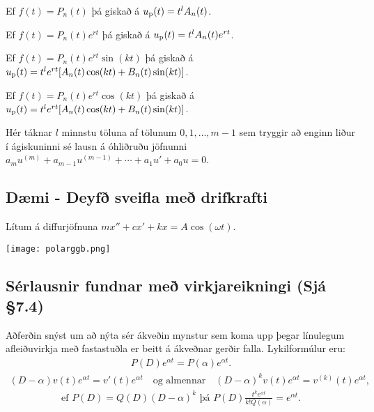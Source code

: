 \documentclass[a4paper,10pt,icelandic]{sphinxmanual}
\begin{document}
Ef \(f(t)=P_n(t)\) þá giskað á \(u_{\rm p}(t)=t^lA_n(t)\).

Ef \(f(t)=P_n(t)e^{rt}\) þá giskað á \(u_{\rm p}(t)=t^lA_n(t)e^{rt}\).

Ef \(f(t)=P_n(t)e^{rt}\sin(kt)\) þá giskað á \(u_{\rm p}(t)=t^le^{rt}[A_n(t)\cos(kt)+B_n(t)\sin(kt)]\).

Ef \(f(t)=P_n(t)e^{rt}\cos(kt)\) þá giskað á \(u_{\rm p}(t)=t^le^{rt}[A_n(t)\cos(kt)+B_n(t)\sin(kt)]\).

Hér táknar \(l\) minnstu töluna af tölunum \(0, 1, \ldots, m-1\) sem tryggir að enginn liður í ágiskuninni sé lausn á óhliðruðu jöfnunni \(a_mu^{(m)}+a_{m-1}u^{(m-1)}+\cdots+a_1u'+a_0u=0\).


\subsection{Dæmi - Deyfð sveifla með drifkrafti}
\label{\detokenize{Kafli07:daemi-deyf-sveifla-me-drifkrafti}}
Lítum á diffurjöfnuna \(mx''+cx'+kx=A\cos(\omega t)\).


\begin{center}
\texttt{[image: polarggb.png]}
\end{center}



\subsection{Sérlausnir fundnar með virkjareikningi (Sjá \S{}7.4)}
\label{\detokenize{Kafli07:serlausnir-fundnar-me-virkjareikningi-sja-7-4}}
Aðferðin snýst um að nýta sér ákveðin mynstur sem koma upp þegar línulegum afleiðuvirkja með fastastuðla er beitt á ákveðnar gerðir falla. Lykilformúlur eru:
\begin{equation*}
\begin{split}P(D)e^{\alpha t}=P(\alpha)e^{\alpha t}.\end{split}
\end{equation*}\begin{equation*}
\begin{split}(D-\alpha)v(t)e^{\alpha t}=v'(t)e^{\alpha t}\quad\mbox{og
  almennar}\quad (D-\alpha)^kv(t)  e^{\alpha t}=v^{(k)}(t)e^{\alpha
  t},\end{split}
\end{equation*}\begin{equation*}
\begin{split}\mbox{ef } P(D)=Q(D)(D-\alpha)^k\mbox{ þá }
P(D)\frac{t^ke^{\alpha t}}{k!Q(\alpha)}=e^{\alpha t}.\end{split}
\end{equation*}
\end{document}
